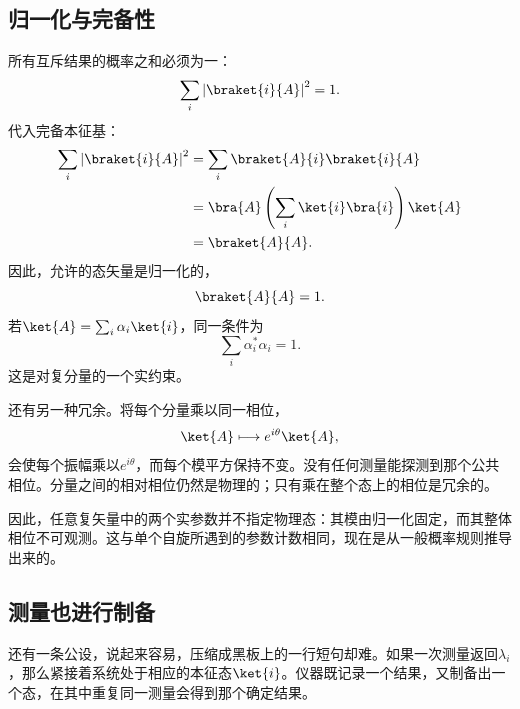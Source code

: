 \subsection{归一化与完备性}

所有互斥结果的概率之和必须为一：
\begin{equation}
\sum_i\left|\braket{i}{A}\right|^2=1.
\label{eq:probability-normalization}
\end{equation}
代入完备本征基：
\begin{align}
\sum_i\left|\braket{i}{A}\right|^2
 &=\sum_i\braket{A}{i}\braket{i}{A}\\
 &=\bra{A}\left(\sum_i\ket{i}\bra{i}\right)\ket{A}\\
 &=\braket{A}{A}.
\end{align}
因此，允许的态矢量是归一化的，
\begin{equation}
\braket{A}{A}=1.
\label{eq:state-normalization}
\end{equation}
若\(\ket{A}=\sum_i\alpha_i\ket{i}\)，同一条件为
\begin{equation}
\sum_i\alpha_i^*\alpha_i=1.
\label{eq:component-normalization}
\end{equation}
这是对复分量的一个实约束。

\begin{classroomqa}
\end{classroomqa}

还有另一种冗余。将每个分量乘以同一相位，
\begin{equation}
\ket{A}\longmapsto e^{i\theta}\ket{A},
\label{eq:l3-global-phase}
\end{equation}
会使每个振幅乘以\(e^{i\theta}\)，而每个模平方保持不变。没有任何测量能探测到那个公共相位。分量之间的相对相位仍然是物理的；只有乘在整个态上的相位是冗余的。

因此，任意复矢量中的两个实参数并不指定物理态：其模由归一化固定，而其整体相位不可观测。这与单个自旋所遇到的参数计数相同，现在是从一般概率规则推导出来的。

\subsection{测量也进行制备}

还有一条公设，说起来容易，压缩成黑板上的一行短句却难。如果一次测量返回\(\lambda_i\)，那么紧接着系统处于相应的本征态\(\ket{i}\)。仪器既记录一个结果，又制备出一个态，在其中重复同一测量会得到那个确定结果。

